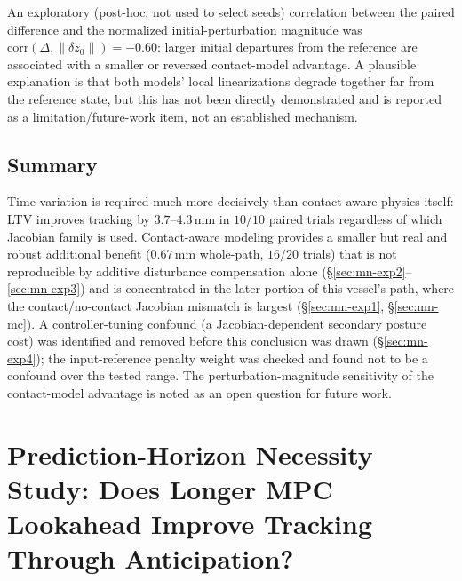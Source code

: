 \documentclass[journal]{IEEEtran}
\begin{document}
An exploratory (post-hoc, not used to select seeds) correlation
between the paired difference and the normalized initial-perturbation
magnitude was $\mathrm{corr}(\Delta,\lVert\delta z_0\rVert)=-0.60$:
larger initial departures from the reference are associated with a
smaller or reversed contact-model advantage. A plausible explanation
is that both models' local linearizations degrade together far from
the reference state, but this has not been directly demonstrated and
is reported as a limitation/future-work item, not an established
mechanism.

\subsection{Summary}
\label{sec:mn-summary}

Time-variation is required much more decisively than contact-aware
physics itself: LTV improves tracking by $3.7$--$4.3\,\mathrm{mm}$ in
$10/10$ paired trials regardless of which Jacobian family is used.
Contact-aware modeling provides a smaller but real and robust
additional benefit ($0.67\,\mathrm{mm}$ whole-path, $16/20$ trials)
that is not reproducible by additive disturbance compensation alone
(\S\ref{sec:mn-exp2}--\ref{sec:mn-exp3}) and is concentrated in the
later portion of this vessel's path, where the contact/no-contact
Jacobian mismatch is largest (\S\ref{sec:mn-exp1},
\S\ref{sec:mn-mc}). A controller-tuning confound (a Jacobian-dependent
secondary posture cost) was identified and removed before this
conclusion was drawn (\S\ref{sec:mn-exp4}); the input-reference penalty
weight was checked and found not to be a confound over the tested
range. The perturbation-magnitude sensitivity of the contact-model
advantage is noted as an open question for future work.


\section{Prediction-Horizon Necessity Study: Does Longer MPC Lookahead Improve Tracking Through Anticipation?}
\label{sec:horizon-necessity}
\end{document}
